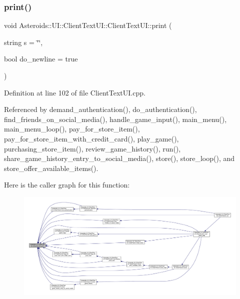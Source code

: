 \subsubsection{\texorpdfstring{print()}{print()}}
{\footnotesize\ttfamily void Asteroids\+::\+U\+I\+::\+Client\+Text\+U\+I\+::\+Client\+Text\+U\+I\+::print (\begin{DoxyParamCaption}\item[{string}]{s = {\ttfamily \char`\"{}\char`\"{}},  }\item[{bool}]{do\+\_\+newline = {\ttfamily true} }\end{DoxyParamCaption})\hspace{0.3cm}{\ttfamily [private]}}



Definition at line 102 of file Client\+Text\+U\+I.\+cpp.



Referenced by demand\+\_\+authentication(), do\+\_\+authentication(), find\+\_\+friends\+\_\+on\+\_\+social\+\_\+media(), handle\+\_\+game\+\_\+input(), main\+\_\+menu(), main\+\_\+menu\+\_\+loop(), pay\+\_\+for\+\_\+store\+\_\+item(), pay\+\_\+for\+\_\+store\+\_\+item\+\_\+with\+\_\+credit\+\_\+card(), play\+\_\+game(), purchasing\+\_\+store\+\_\+item(), review\+\_\+game\+\_\+history(), run(), share\+\_\+game\+\_\+history\+\_\+entry\+\_\+to\+\_\+social\+\_\+media(), store(), store\+\_\+loop(), and store\+\_\+offer\+\_\+available\+\_\+items().

Here is the caller graph for this function\+:
\nopagebreak
\begin{figure}[H]
\begin{center}
\leavevmode
\includegraphics[width=350pt]{classAsteroids_1_1UI_1_1ClientTextUI_1_1ClientTextUI_a41f904ea570af3e3a8c4d70da8411ef3_icgraph}
\end{center}
\end{figure}
\mbox{\label{classAsteroids_1_1UI_1_1ClientTextUI_1_1ClientTextUI_a469a7cd3423794fa0ca7c34d95db5a10}} 
